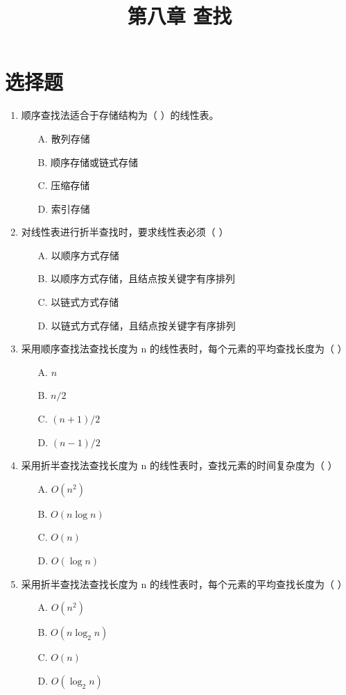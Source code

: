 \documentclass[12pt, a4paper]{article}
\title{\textbf{第八章 查找}}
\author{}
\date{}
\begin{document}
\section*{选择题}

\begin{enumerate}[label=\arabic*.]
	\item 顺序查找法适合于存储结构为（ ）的线性表。
	      \begin{enumerate}
		      \item[A.] 散列存储
		      \item[B.] 顺序存储或链式存储
		      \item[C.] 压缩存储
		      \item[D.] 索引存储
	      \end{enumerate}

	\item 对线性表进行折半查找时，要求线性表必须（ ）
	      \begin{enumerate}
		      \item[A.] 以顺序方式存储
		      \item[B.] 以顺序方式存储，且结点按关键字有序排列
		      \item[C.] 以链式方式存储
		      \item[D.] 以链式方式存储，且结点按关键字有序排列
	      \end{enumerate}

	\item 采用顺序查找法查找长度为 n 的线性表时，每个元素的平均查找长度为（ ）
	      \begin{enumerate}
		      \item[A.] $n$
		      \item[B.] $n/2$
		      \item[C.] $(n+1)/2$
		      \item[D.] $(n-1)/2$
	      \end{enumerate}

	\item 采用折半查找法查找长度为 n 的线性表时，查找元素的时间复杂度为（ ）
	      \begin{enumerate}
		      \item[A.] $O(n^2)$
		      \item[B.] $O(n \log n)$
		      \item[C.] $O(n)$
		      \item[D.] $O(\log n)$
	      \end{enumerate}

	\item 采用折半查找法查找长度为 n 的线性表时，每个元素的平均查找长度为（ ）
	      \begin{enumerate}
		      \item[A.] $O(n^2)$
		      \item[B.] $O(n \log_2 n)$
		      \item[C.] $O(n)$
		      \item[D.] $O(\log_2 n)$
	      \end{enumerate}


\end{enumerate}
\end{document}
